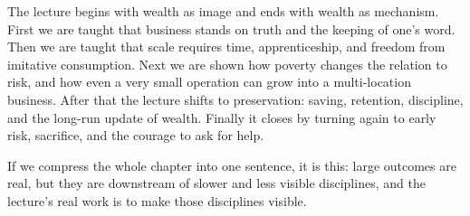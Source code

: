 The lecture begins with wealth as image and ends with wealth as mechanism. First we are taught that business stands on truth and the keeping of one's word. Then we are taught that scale requires time, apprenticeship, and freedom from imitative consumption. Next we are shown how poverty changes the relation to risk, and how even a very small operation can grow into a multi-location business. After that the lecture shifts to preservation: saving, retention, discipline, and the long-run update of wealth. Finally it closes by turning again to early risk, sacrifice, and the courage to ask for help.

If we compress the whole chapter into one sentence, it is this: large outcomes are real, but they are downstream of slower and less visible disciplines, and the lecture's real work is to make those disciplines visible.